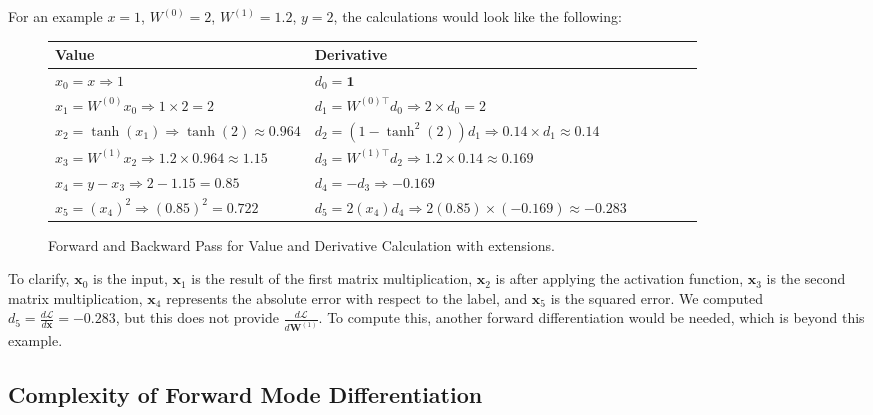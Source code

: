 For an example $x = 1$, $W^{(0)} = 2$, $W^{(1)} = 1.2$, $y = 2$, the calculations would look like the following:
\begin{figure}[h!]
    \centering
    \begin{tabularx}{\linewidth}{p{0.4\linewidth} p{0.6\linewidth}}
        \toprule
        \textbf{Value}                                                & \textbf{Derivative}                                                   \\
        \midrule
        $x_0 = x \Rightarrow 1$                                       & $d_0 = \bm{1}$                                                        \\
        $x_1 = W^{(0)} x_0 \Rightarrow 1 \times 2 = 2$                & $d_1 = W^{(0)\top} d_0 \Rightarrow 2 \times d_0 = 2$                  \\
        $x_2 = \tanh(x_1) \Rightarrow \tanh(2) \approx 0.964$         & $d_2 = (1 - \tanh^2(2)) d_1 \Rightarrow 0.14 \times d_1 \approx 0.14$ \\
        $x_3 = W^{(1)} x_2 \Rightarrow 1.2 \times 0.964 \approx 1.15$ & $d_3 = W^{(1)\top} d_2 \Rightarrow 1.2 \times 0.14 \approx 0.169$     \\
        $x_4 = y - x_3 \Rightarrow 2 - 1.15 = 0.85$                   & $d_4 = -d_3 \Rightarrow -0.169$                                       \\
        $x_5 = (x_4)^2 \Rightarrow (0.85)^2 = 0.722$                  & $d_5 = 2(x_4) d_4 \Rightarrow 2(0.85) \times (-0.169) \approx -0.283$ \\
        \bottomrule
    \end{tabularx}
    \caption{Forward and Backward Pass for Value and Derivative Calculation with extensions.}
\end{figure}


To clarify, \( \bm{x}_0 \) is the input, \( \bm{x}_1 \) is the result of the first matrix multiplication, \( \bm{x}_2 \) is after applying the activation function, \( \bm{x}_3 \) is the second matrix multiplication, \( \bm{x}_4 \) represents the absolute error with respect to the label, and \( \bm{x}_5 \) is the squared error. We computed \( d_5 = \frac{d \mathcal{L}}{d \bm{x}} = -0.283 \), but this does not provide \( \frac{d \mathcal{L}}{d \bm{W}^{(1)}} \). To compute this, another forward differentiation would be needed, which is beyond this example.


\subsection{Complexity of Forward Mode Differentiation}

